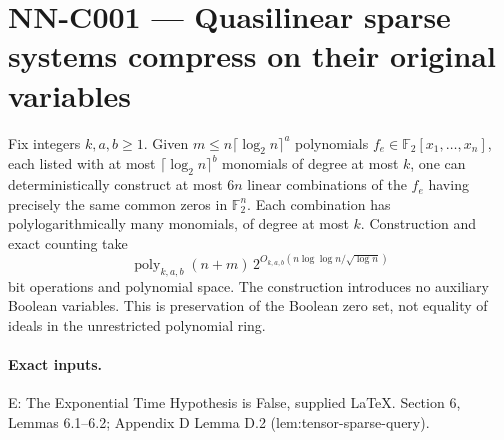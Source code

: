 \section{NN-C001 --- Quasilinear sparse systems compress on their original variables}
\begin{proposition}[NN-C001]
Fix integers $k,a,b\geq1$. Given $m\leq n\lceil\log_2 n\rceil^a$ polynomials $f_e\in\mathbb F_2[x_1,\ldots,x_n]$, each listed with at most $\lceil\log_2 n\rceil^b$ monomials of degree at most $k$, one can deterministically construct at most $6n$ linear combinations of the $f_e$ having precisely the same common zeros in $\mathbb F_2^n$. Each combination has polylogarithmically many monomials, of degree at most $k$. Construction and exact counting take
\[
 \operatorname{poly}_{k,a,b}(n+m)\,
 2^{O_{k,a,b}(n\log\log n/\sqrt{\log n})}
\]
bit operations and polynomial space. The construction introduces no auxiliary Boolean variables. This is preservation of the Boolean zero set, not equality of ideals in the unrestricted polynomial ring.
\end{proposition}
\paragraph{Exact inputs.}
E: The Exponential Time Hypothesis is False, supplied LaTeX. Section 6, Lemmas 6.1--6.2; Appendix D Lemma D.2 (lem:tensor-sparse-query).

